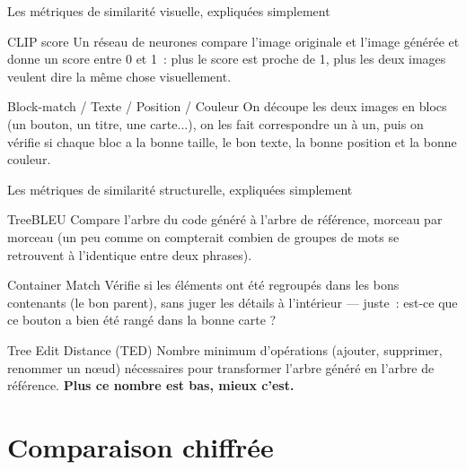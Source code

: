 \documentclass[11pt]{beamer}
\begin{document}
\begin{frame}{Les métriques de similarité visuelle, expliquées simplement}
\begin{block}{CLIP score}
\small Un réseau de neurones compare l'image originale et l'image générée et donne un score entre 0 et 1~: plus le score est proche de 1, plus les deux images \og{}veulent dire la même chose\fg{} visuellement.
\end{block}
\begin{block}{Block-match / Texte / Position / Couleur}
\small On découpe les deux images en blocs (un bouton, un titre, une carte...), on les fait correspondre un à un, puis on vérifie si chaque bloc a la bonne taille, le bon texte, la bonne position et la bonne couleur.
\end{block}
\end{frame}

\begin{frame}{Les métriques de similarité structurelle, expliquées simplement}
\begin{block}{TreeBLEU}
\small Compare l'arbre du code généré à l'arbre de référence, morceau par morceau (un peu comme on compterait combien de groupes de mots se retrouvent à l'identique entre deux phrases).
\end{block}
\begin{block}{Container Match}
\small Vérifie si les éléments ont été regroupés dans les bons \og{}contenants\fg{} (le bon parent), sans juger les détails à l'intérieur --- juste~: est-ce que ce bouton a bien été rangé dans la bonne carte ?
\end{block}
\begin{block}{Tree Edit Distance (TED)}
\small Nombre minimum d'opérations (ajouter, supprimer, renommer un nœud) nécessaires pour transformer l'arbre généré en l'arbre de référence. \textbf{Plus ce nombre est bas, mieux c'est.}
\end{block}
\end{frame}

\section{Comparaison chiffrée}
\end{document}
